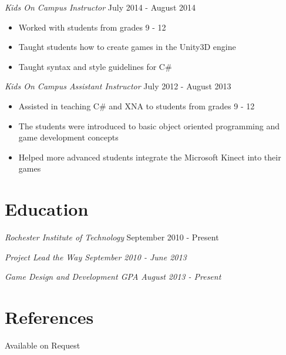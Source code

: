 \documentclass[line,margin]{res}
\begin{document}
\begin{resume}
{\sl Kids On Campus Instructor} \hfill July 2014 - August 2014
\begin{itemize}
\itemsep1pt\parskip0pt
\item
  Worked with students from grades 9 - 12
\item
  Taught students how to create games in the Unity3D engine
\item
  Taught syntax and style guidelines for C\#
\end{itemize}

{\sl Kids On Campus Assistant Instructor} \hfill July 2012 - August 2013
\begin{itemize}
\itemsep1pt\parskip0pt
\item
  Assisted in teaching C\# and XNA to students from grades 9 - 12
\item
  The students were introduced to basic object oriented programming and
  game development concepts
\item
  Helped more advanced students integrate the Microsoft Kinect into
  their games
\end{itemize}


\section{Education}
{\sl Rochester Institute of Technology} \hfill September 2010 - Present

\qquad \sl{Project Lead the Way} \hfill September 2010 - June 2013

\qquad \sl{Game Design and Development}  GPA \hfill August 2013 - Present


\section{References}
Available on Request


\end{resume}
\end{document}
